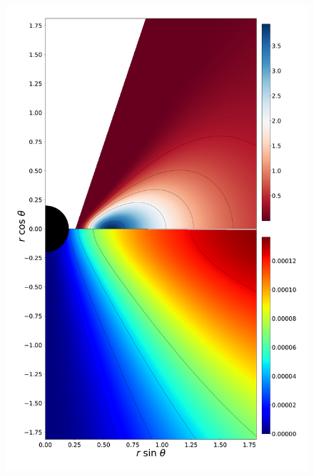 \documentclass[twocolumn,aps,showpacs,showkeys,prd,superscriptaddress,byrevtex, amsmath]{revtex4-1}
\begin{document}
\begin{figure}
\centering
\includegraphics[scale=0.12]{figures/fig5_I_10.pdf}
\hspace{-0.3cm}

\end{figure}
\end{document}
